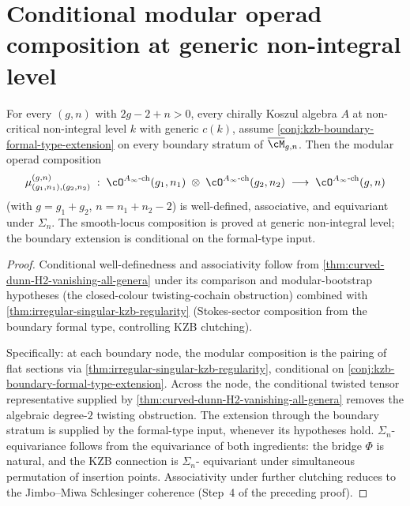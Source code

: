 \section{Conditional modular operad composition at generic non-integral level}
\label{sec:modular-op-composition}

\begin{corollary}
\label{cor:modular-operad-composition-all-levels}
\ClaimStatusConditional
For every \((g, n)\) with \(2g - 2 + n > 0\), every chirally Koszul
algebra \(A\) at non-critical non-integral level \(k\) with
generic \(c(k)\), assume
\autoref{conj:kzb-boundary-formal-type-extension} on every
boundary stratum of \(\overline{\cM}_{g,n}\). Then the modular
operad composition
\[
 \mu_{(g_{1},n_{1}),(g_{2},n_{2})}^{(g,n)}\;:\;
 \cO^{A_{\infty}\text{-ch}}(g_{1}, n_{1})
 \;\otimes\;
 \cO^{A_{\infty}\text{-ch}}(g_{2}, n_{2})
 \;\longrightarrow\;
 \cO^{A_{\infty}\text{-ch}}(g, n)
\]
(with \(g = g_{1} + g_{2}\), \(n = n_{1} + n_{2} - 2\)) is
well-defined, associative, and equivariant under \(\Sigma_{n}\).
The smooth-locus composition is proved at generic non-integral
level; the boundary extension is conditional on the formal-type
input.
\end{corollary}

\begin{proof}
Conditional well-definedness and associativity follow from
\autoref{thm:curved-dunn-H2-vanishing-all-genera} under its
comparison and modular-bootstrap hypotheses (the closed-colour
twisting-cochain obstruction) combined with
\autoref{thm:irregular-singular-kzb-regularity} (Stokes-sector
composition from the boundary formal type, controlling KZB
clutching).

Specifically: at each boundary node, the modular composition is
the pairing of flat sections via
\autoref{thm:irregular-singular-kzb-regularity}, conditional on
\autoref{conj:kzb-boundary-formal-type-extension}. Across the node,
the conditional twisted tensor representative supplied by
\autoref{thm:curved-dunn-H2-vanishing-all-genera} removes the
algebraic degree-\(2\) twisting obstruction. The extension through
the boundary stratum is supplied by the formal-type input, whenever
its hypotheses hold.
\(\Sigma_{n}\)-equivariance
follows from the equivariance of both ingredients: the bridge
\(\Phi\) is natural, and the KZB connection is \(\Sigma_{n}\)-
equivariant under simultaneous permutation of insertion points.
Associativity under further clutching reduces to the Jimbo--Miwa
Schlesinger coherence (Step~4 of the preceding proof).
\end{proof}

